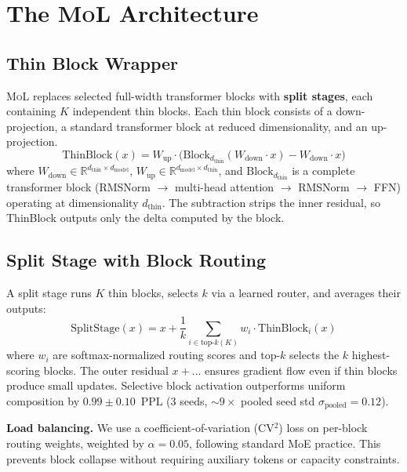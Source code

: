 \documentclass[10pt]{article}
\newcommand{\mol}{\textsc{MoL}}
\newcommand{\dmodel}{d_\text{model}}
\newcommand{\dthin}{d_\text{thin}}
\newcommand{\topk}{\text{top-}k}
\newcommand{\Paragraph}[1]{\vspace{0.5em}\noindent\textbf{#1}}
\begin{document}
\section{The \mol{} Architecture}
\label{sec:mol}

\subsection{Thin Block Wrapper}

\mol{} replaces selected full-width transformer blocks with \textbf{split stages}, each containing $K$ independent thin blocks.
Each thin block consists of a down-projection, a standard transformer block at reduced dimensionality, and an up-projection.
\begin{equation}
\text{ThinBlock}(x) = W_\text{up} \cdot \big(\text{Block}_{\dthin}(W_\text{down} \cdot x) - W_\text{down} \cdot x\big)
\label{eq:thinblock}
\end{equation}
where $W_\text{down} \in \mathbb{R}^{\dthin \times \dmodel}$, $W_\text{up} \in \mathbb{R}^{\dmodel \times \dthin}$, and $\text{Block}_{\dthin}$ is a complete transformer block (RMSNorm $\to$ multi-head attention $\to$ RMSNorm $\to$ FFN) operating at dimensionality $\dthin$.
The subtraction strips the inner residual, so ThinBlock outputs only the delta computed by the block.

\subsection{Split Stage with Block Routing}

A split stage runs $K$ thin blocks, selects $k$ via a learned router, and averages their outputs:
\begin{equation}
\text{SplitStage}(x) = x + \frac{1}{k} \sum_{i \in \topk(K)} w_i \cdot \text{ThinBlock}_i(x)
\label{eq:splitstage}
\end{equation}
where $w_i$ are softmax-normalized routing scores and $\topk$ selects the $k$ highest-scoring blocks.
The outer residual $x + \ldots$ ensures gradient flow even if thin blocks produce small updates.
Selective block activation outperforms uniform composition by $0.99 \pm 0.10$~PPL (3 seeds, ${\sim}9\times$ pooled seed std $\sigma_\text{pooled}{=}0.12$).


\Paragraph{Load balancing.}
We use a coefficient-of-variation (CV$^2$) loss on per-block routing weights, weighted by $\alpha{=}0.05$, following standard MoE practice.
This prevents block collapse without requiring auxiliary tokens or capacity constraints.
\end{document}
